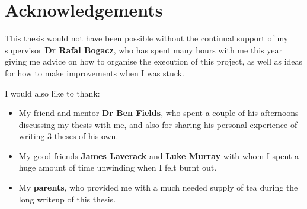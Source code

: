 \documentclass[ %
                    author={Sam Phippen},
                supervisor={Dr. Rafal Bogacz},
                     title={Real time voice activity detectors in noisy personal computing environments},
                  subtitle={},
                    degree={MEng},
                      year={2012} ]{thesis}
\begin{document}

\chapter*{Acknowledgements}

\vspace{1cm}

This thesis would not have been possible without the continual support of my
supervisor {\bf Dr Rafal Bogacz}, who has spent many hours with me this year giving
me advice on how to organise the execution of this project, as well as ideas
for how to make improvements when I was stuck.

I would also like to thank:
\begin{itemize}

    \item My friend and mentor {\bf Dr Ben Fields}, who spent a couple of his
        afternoons discussing my thesis with me, and also for sharing his
        personal experience of writing 3 theses of his own.

    \item My good friends {\bf James Laverack} and {\bf Luke Murray} with whom I spent a
        huge amount of time unwinding when I felt burnt out.

    \item My {\bf parents}, who provided me with a much needed supply of tea during
        the long writeup of this thesis.

\end{itemize}


%

\mainmatter

\end{document}
